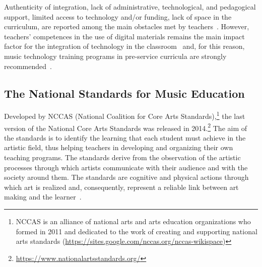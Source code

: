 \documentclass[journal]{IEEEtran}
\begin{document}
Authenticity of integration, lack of administrative, technological, and pedagogical support, limited access to technology and/or funding, lack of space in the curriculum, are reported among the main obstacles met by teachers~\cite{bakir2015exploration, bauer2016technology, dorfman2016music, eyles2018teachers}. However, teachers' competences in the use of digital materials remains the main impact factor for the integration of technology in the classroom~\cite{trainin2018impact, wise2011teachers} and, for this reason, music technology training programs in pre-service curricula are strongly recommended~\cite{bakir2015exploration}.


\subsection{The National Standards for Music Education}
\label{subsec:3AP}
Developed by NCCAS (National Coalition for Core Arts Standards),\footnote{NCCAS is an alliance of national arts and arts education organizations who formed in 2011 and dedicated to the work of creating and supporting national arts standards (\url{https://sites.google.com/nccas.org/nccas-wikispace})} the last version of the National Core Arts Standards was released in 2014.\footnote{\url{https://www.nationalartsstandards.org/}} The aim of the standards is to identify the learning that each student must achieve in the artistic field, thus helping teachers in developing and organizing their own teaching programs. The standards derive from the observation of the artistic processes through which artists communicate with their audience and with the society around them. The standards are  cognitive and physical actions through which art is realized and, consequently, represent a reliable link between art making and the learner~\cite{NCCAS}. 
\end{document}
